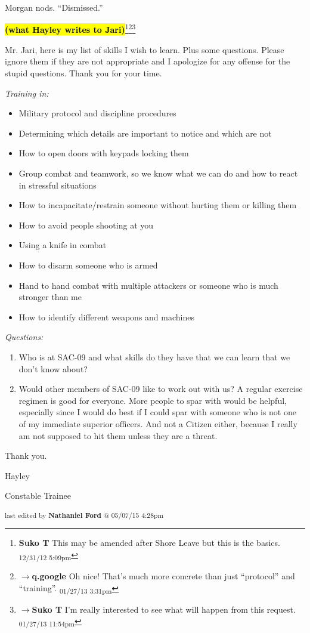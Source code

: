 Morgan nods. ``Dismissed.''


\textbf{\hl{(what Hayley writes to Jari)}}\footnote{\textbf{Suko T }This may be amended after Shore Leave but this is the basics. \textsubscript{12/31/12 5:09pm}}\footnote{$\rightarrow$\textbf{q.google }Oh nice!  That's much more concrete than just ``protocol'' and ``training''. \textsubscript{01/27/13 3:31pm}}\footnote{$\rightarrow$\textbf{Suko T }I'm really interested to see what will happen from this request. \textsubscript{01/27/13 11:54pm}}

Mr. Jari, here is my list of skills I wish to learn.  Plus some questions.  Please ignore them if they are not appropriate and I apologize for any offense for the stupid questions.  Thank you for your time.



\textit{Training in:}

\begin{itemize}
\item Military protocol and discipline procedures
\item Determining which details are important to notice and which are not
\item How to open doors with keypads locking them
\item Group combat and teamwork, so we know what we can do and how to react in stressful situations
\item How to incapacitate/restrain someone without hurting them or killing them
\item How to avoid people shooting at you
\item Using a knife in combat
\item How to disarm someone who is armed
\item Hand to hand combat with multiple attackers or someone who is much stronger than me
\item How to identify different weapons and machines
\end{itemize}



\textit{Questions:}

\begin{enumerate}
\item Who is at SAC-09 and what skills do they have that we can learn that we don't know about?
\item Would other members of SAC-09 like to work out with us?  A regular exercise regimen is good for everyone.  More people to spar with would be helpful, especially since I would do best if I could spar with someone who is not one of my immediate superior officers.  And not a Citizen either, because I really am not supposed to hit them unless they are a threat. 
\end{enumerate}



Thank you.



Hayley

Constable Trainee


\vspace{\fill}

\begin{flushright}
\textsubscript{last edited by \textbf{Nathaniel Ford} @ 05/07/15 4:28pm}
\end{flushright}

